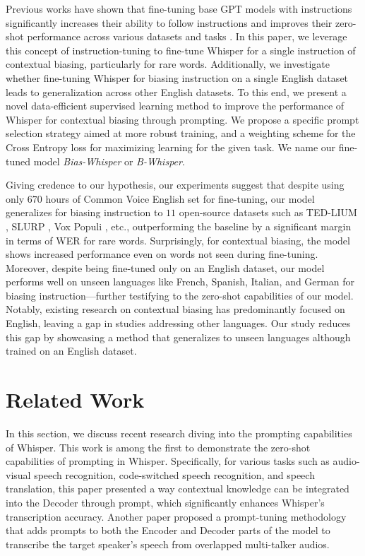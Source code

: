\documentclass{article}
\begin{document}
Previous works have shown that fine-tuning base GPT models with instructions significantly increases their ability to follow instructions and improves their zero-shot performance across various datasets and tasks \cite{humanfeedback}. In this paper, we leverage this concept of instruction-tuning to fine-tune Whisper for a single instruction of contextual biasing, particularly for rare words. Additionally, we investigate whether fine-tuning Whisper for biasing instruction on a single English dataset leads to generalization across other English datasets. To this end, we present a novel data-efficient supervised learning method to improve the performance of Whisper for contextual biasing through prompting. We propose a specific prompt selection strategy aimed at more robust training, and a weighting scheme for the Cross Entropy loss for maximizing learning for the given task. We name our fine-tuned model \textit{Bias-Whisper} or \textit{B-Whisper}.

 Giving credence to our hypothesis, our experiments suggest that despite using only $670$ hours of Common Voice English set \cite{cv} for fine-tuning, our model generalizes for biasing instruction to $11$ open-source datasets such as TED-LIUM \cite{tedlium}, SLURP \cite{slurp}, Vox Populi \cite{vox}, etc., outperforming the baseline by a significant margin in terms of WER for rare words. Surprisingly, for contextual biasing, the model shows increased performance even on words not seen during fine-tuning. Moreover, despite being fine-tuned only on an English dataset, our model performs well on unseen languages like French, Spanish, Italian, and German for biasing instruction---further testifying to the zero-shot capabilities of our model. Notably, existing research on contextual biasing has predominantly focused on English, leaving a gap in studies addressing other languages. Our study reduces this gap by showcasing a method that generalizes to unseen languages although trained on an English dataset.

\section{Related Work}

In this section, we discuss recent research diving into the prompting capabilities of Whisper. 
This work \cite{application3} is among the first to demonstrate the zero-shot capabilities of prompting in Whisper. Specifically, for various tasks such as audio-visual speech recognition, code-switched speech recognition, and speech translation, this paper presented a way contextual knowledge can be integrated into the Decoder through prompt, which significantly enhances Whisper's transcription accuracy. Another paper \cite{speakerprompt} proposed a prompt-tuning methodology that adds prompts to both the Encoder and Decoder parts of the model to transcribe the target speaker's speech from overlapped multi-talker audios.
\end{document}
